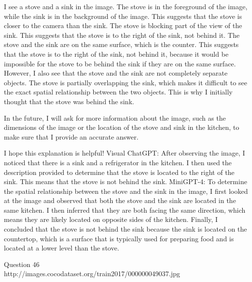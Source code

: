 \begin{enumerate}
    I see a stove and a sink in the image.
    The stove is in the foreground of the image, while the sink is in the background of the image. This suggests that the stove is closer to the camera than the sink.
    The stove is blocking part of the view of the sink. This suggests that the stove is to the right of the sink, not behind it.
    The stove and the sink are on the same surface, which is the counter. This suggests that the stove is to the right of the sink, not behind it, because it would be impossible for the stove to be behind the sink if they are on the same surface.
    However, I also see that the stove and the sink are not completely separate objects. The stove is partially overlapping the sink, which makes it difficult to see the exact spatial relationship between the two objects. This is why I initially thought that the stove was behind the sink.
    
    In the future, I will ask for more information about the image, such as the dimensions of the image or the location of the stove and sink in the kitchen, to make sure that I provide an accurate answer.
    
    I hope this explanation is helpful!
    \subitem Visual ChatGPT: After observing the image, I noticed that there is a sink and a refrigerator in the kitchen. I then used the description provided to determine that the stove is located to the right of the sink. This means that the stove is not behind the sink.
    \subitem MiniGPT-4: To determine the spatial relationship between the stove and the sink in the image, I first looked at the image and observed that both the stove and the sink are located in the same kitchen. I then inferred that they are both facing the same direction, which means they are likely located on opposite sides of the kitchen. Finally, I concluded that the stove is not behind the sink because the sink is located on the countertop, which is a surface that is typically used for preparing food and is located at a lower level than the stove.
\end{enumerate}
Question 46\\
http://images.cocodataset.org/train2017/000000049037.jpg

